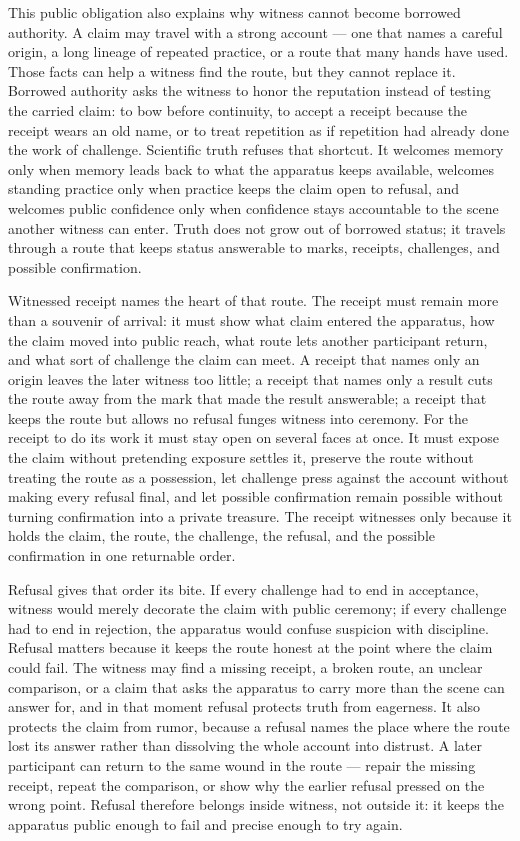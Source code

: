 This public obligation also explains why witness cannot become borrowed authority. A claim may travel with a strong account --- one that names a careful origin, a long lineage of repeated practice, or a route that many hands have used. Those facts can help a witness find the route, but they cannot replace it. Borrowed authority asks the witness to honor the reputation instead of testing the carried claim: to bow before continuity, to accept a receipt because the receipt wears an old name, or to treat repetition as if repetition had already done the work of challenge. Scientific truth refuses that shortcut. It welcomes memory only when memory leads back to what the apparatus keeps available, welcomes standing practice only when practice keeps the claim open to refusal, and welcomes public confidence only when confidence stays accountable to the scene another witness can enter. Truth does not grow out of borrowed status; it travels through a route that keeps status answerable to marks, receipts, challenges, and possible confirmation.

Witnessed receipt names the heart of that route. The receipt must remain more than a souvenir of arrival: it must show what claim entered the apparatus, how the claim moved into public reach, what route lets another participant return, and what sort of challenge the claim can meet. A receipt that names only an origin leaves the later witness too little; a receipt that names only a result cuts the route away from the mark that made the result answerable; a receipt that keeps the route but allows no refusal funges witness into ceremony. For the receipt to do its work it must stay open on several faces at once. It must expose the claim without pretending exposure settles it, preserve the route without treating the route as a possession, let challenge press against the account without making every refusal final, and let possible confirmation remain possible without turning confirmation into a private treasure. The receipt witnesses only because it holds the claim, the route, the challenge, the refusal, and the possible confirmation in one returnable order.

Refusal gives that order its bite. If every challenge had to end in acceptance, witness would merely decorate the claim with public ceremony; if every challenge had to end in rejection, the apparatus would confuse suspicion with discipline. Refusal matters because it keeps the route honest at the point where the claim could fail. The witness may find a missing receipt, a broken route, an unclear comparison, or a claim that asks the apparatus to carry more than the scene can answer for, and in that moment refusal protects truth from eagerness. It also protects the claim from rumor, because a refusal names the place where the route lost its answer rather than dissolving the whole account into distrust. A later participant can return to the same wound in the route --- repair the missing receipt, repeat the comparison, or show why the earlier refusal pressed on the wrong point. Refusal therefore belongs inside witness, not outside it: it keeps the apparatus public enough to fail and precise enough to try again.

